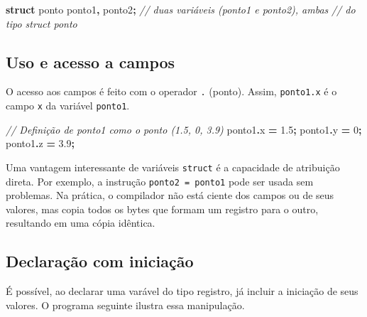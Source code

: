 \documentclass[
  11pt,
  a4paper,
]{scrbook}
\newenvironment{Shaded}{\begin{snugshade}}{\end{snugshade}}
\newcommand{\CommentTok}[1]{\textcolor[rgb]{0.56,0.35,0.01}{\textit{#1}}}
\newcommand{\DecValTok}[1]{\textcolor[rgb]{0.00,0.00,0.81}{#1}}
\newcommand{\FloatTok}[1]{\textcolor[rgb]{0.00,0.00,0.81}{#1}}
\newcommand{\KeywordTok}[1]{\textcolor[rgb]{0.13,0.29,0.53}{\textbf{#1}}}
\newcommand{\NormalTok}[1]{#1}
\newcommand{\OperatorTok}[1]{\textcolor[rgb]{0.81,0.36,0.00}{\textbf{#1}}}
\begin{document}
\begin{Shaded}
\begin{Highlighting}[]
\KeywordTok{struct}\NormalTok{ ponto ponto1}\OperatorTok{,}\NormalTok{ ponto2}\OperatorTok{;}  \CommentTok{// duas variáveis (ponto1 e ponto2), ambas}
                              \CommentTok{// do tipo struct ponto}
\end{Highlighting}
\end{Shaded}

\subsection{Uso e acesso a campos}\label{uso-e-acesso-a-campos}

O acesso aos campos é feito com o operador \texttt{.} (ponto). Assim,
\texttt{ponto1.x} é o campo \texttt{x} da variável \texttt{ponto1}.

\begin{Shaded}
\begin{Highlighting}[]
\CommentTok{// Definição de ponto1 como o ponto (1.5, 0, 3.9)}
\NormalTok{ponto1}\OperatorTok{.}\NormalTok{x }\OperatorTok{=} \FloatTok{1.5}\OperatorTok{;}
\NormalTok{ponto1}\OperatorTok{.}\NormalTok{y }\OperatorTok{=} \DecValTok{0}\OperatorTok{;}
\NormalTok{ponto1}\OperatorTok{.}\NormalTok{z }\OperatorTok{=} \FloatTok{3.9}\OperatorTok{;}
\end{Highlighting}
\end{Shaded}

Uma vantagem interessante de variáveis \texttt{struct} é a capacidade de
atribuição direta. Por exemplo, a instrução \texttt{ponto2\ =\ ponto1}
pode ser usada sem problemas. Na prática, o compilador não está ciente
dos campos ou de seus valores, mas copia todos os bytes que formam um
registro para o outro, resultando em uma cópia idêntica.

\subsection{Declaração com
iniciação}\label{declarauxe7uxe3o-com-iniciauxe7uxe3o}

É possível, ao declarar uma varável do tipo registro, já incluir a
iniciação de seus valores. O programa seguinte ilustra essa manipulação.
\end{document}
